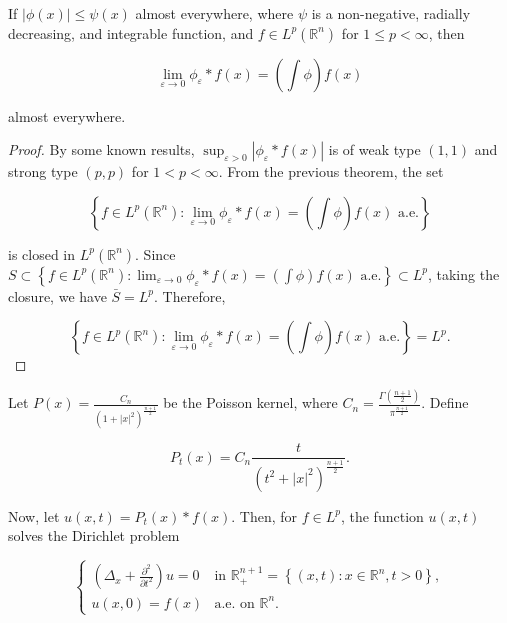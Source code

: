 \begin{theorem}
  If $|\phi(x)| \leqslant \psi(x)$ almost everywhere, where $\psi$ is a non-negative, radially decreasing, and integrable function, and $f \in L^p\left(\mathbb{R}^n\right)$ for $1 \leq p < \infty$, then

$$\lim _{\varepsilon \rightarrow 0} \phi_{\varepsilon} * f(x) = \left(\int \phi\right) f(x)$$

almost everywhere.  
\end{theorem}
\begin{proof}
    By some known results, $\sup _{\varepsilon>0}\left|\phi_{\varepsilon} * f(x)\right|$ is of weak type $(1,1)$ and strong type $(p, p)$ for $1 < p < \infty$.
From the previous theorem, the set

$$\left\{f \in L^p\left(\mathbb{R}^n\right): \lim _{\varepsilon \rightarrow 0} \phi_{\varepsilon} * f(x) = \left(\int \phi\right) f(x) \text{ a.e.}\right\}$$

is closed in $L^p\left(\mathbb{R}^n\right)$.
Since $S \subset \left\{f \in L^p\left(\mathbb{R}^n\right): \lim _{\varepsilon \rightarrow 0} \phi_{\varepsilon} * f(x) = \left(\int \phi\right) f(x) \text{ a.e.}\right\} \subset L^p$,
taking the closure, we have $\bar{S} = L^p$.
Therefore,

$$\left\{f \in L^p\left(\mathbb{R}^n\right): \lim _{\varepsilon \rightarrow 0} \phi_{\varepsilon} * f(x) = \left(\int \phi\right) f(x) \text{ a.e.}\right\} = L^p.$$
\end{proof}
\begin{example}
    Let $P(x) = \frac{C_n}{\left(1 + |x|^2\right)^{\frac{n+1}{2}}}$ be the Poisson kernel, where $C_n = \frac{\Gamma\left(\frac{n+1}{2}\right)}{\pi^{\frac{n+1}{2}}}$.
Define

$$P_t(x) = C_n \frac{t}{\left(t^2 + |x|^2\right)^{\frac{n+1}{2}}}.$$

Now, let $u(x, t) = P_t(x) * f(x)$. Then, for $f \in L^p$, the function $u(x, t)$ solves the Dirichlet problem

$$\begin{cases}
\left(\Delta_x + \frac{\partial^2}{\partial t^2}\right) u = 0 & \text{in } \mathbb{R}_{+}^{n+1} = \left\{(x, t): x \in \mathbb{R}^n, t > 0\right\}, \\
u(x, 0) = f(x) & \text{a.e. on } \mathbb{R}^n.
\end{cases}$$
\end{example}
